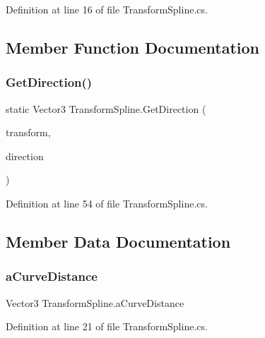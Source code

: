 Definition at line 16 of file Transform\+Spline.\+cs.



\subsection{Member Function Documentation}
\mbox{\label{class_transform_spline_ae694bc324fd3af1d8148ee8c31ddbcc4}} 
\subsubsection{\texorpdfstring{Get\+Direction()}{GetDirection()}}
{\footnotesize\ttfamily static Vector3 Transform\+Spline.\+Get\+Direction (\begin{DoxyParamCaption}\item[{Transform}]{transform,  }\item[{\mbox{\hyperlink{_transform_spline_8cs_aa83ec4569fa5f851dd6585ebb349123b}{Transform\+Direction}}}]{direction }\end{DoxyParamCaption})\hspace{0.3cm}{\ttfamily [static]}}



Definition at line 54 of file Transform\+Spline.\+cs.



\subsection{Member Data Documentation}
\mbox{\label{class_transform_spline_a95be01256f09ffbe5c67fc11aa936534}} 
\subsubsection{\texorpdfstring{a\+Curve\+Distance}{aCurveDistance}}
{\footnotesize\ttfamily Vector3 Transform\+Spline.\+a\+Curve\+Distance}



Definition at line 21 of file Transform\+Spline.\+cs.

\mbox{\label{class_transform_spline_ae4001134ec77ad5ae0e52a95a46fc21a}} 
